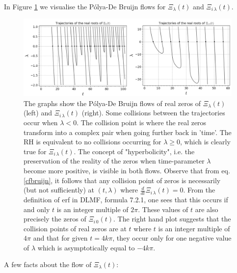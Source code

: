 \documentclass[a4paper,11pt,twoside]{amsart}
\begin{document}
In Figure \ref{fig:poldebruijnflow} we visualise the Pólya-De Bruijn flows for $\Xi_{\lambda}(t)$ and $\Xi_{i\,\lambda}(t)$.
\begin{figure}[H]
  \includegraphics[width=1\linewidth]{PolyaDeBruijnFlowdouble.jpg}
  \caption{The graphs show the Pólya-De Bruijn flows of real zeros of $\Xi_{\lambda}(t)$ (left) and $\Xi_{i\,\lambda}(t)$ (right). Some collisions between the trajectories occur when $\lambda < 0$. The collision point is where the real zeros transform into a complex pair when going further back in 'time'. The RH is equivalent to no collisions occurring for $\lambda \ge 0$, which is clearly true for $\Xi_{i\,\lambda}(t)$. The concept of "hyperbolicity", i.e. the preservation of the reality of the zeros when time-parameter $\lambda$ become more positive, is visible in both flows. Observe that from eq. \ref{cfbruijn}, it follows that any collision point of zeros is necessarily (but not sufficiently) at $(t,\lambda)$ where $\frac{d}{dt} \Xi_{i\,\lambda}(t) =0$. From the definition of erf in DLMF, formula 7.2.1, one sees that this occurs if and only $t$ is an integer multiple of $2\pi$. These values of $t$ are also precisely the zeros of $\Xi_{i\,0}(t)$. The right hand plot suggests that the collision points of real zeros are at $t$ where $t$ is an integer multiple of $4\pi$ and that for given $t=4 k \pi$, they occur only for one negative value of $\lambda$ which is asymptotically equal to $-4k \pi$.}
  \label{fig:poldebruijnflow}
\end{figure}
A few facts about the flow of $\Xi_{\lambda}(t)$:
\end{document}
